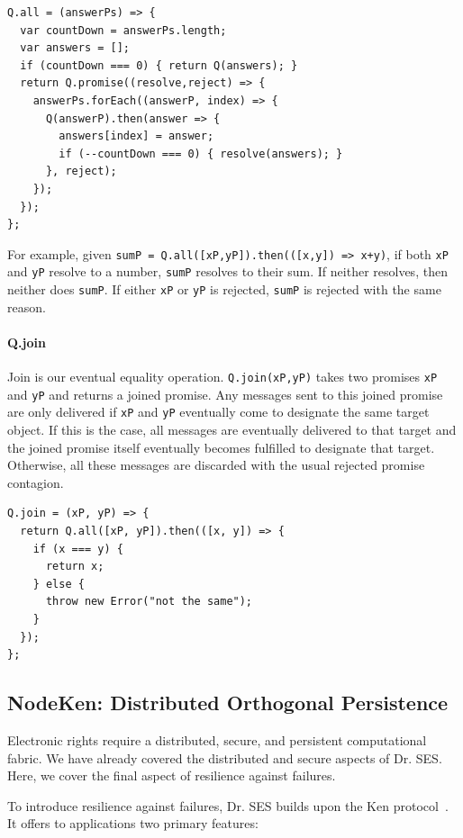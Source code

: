 \documentclass{llncs}
\begin{document}
\begin{verbatim}
Q.all = (answerPs) => {
  var countDown = answerPs.length;
  var answers = [];
  if (countDown === 0) { return Q(answers); }
  return Q.promise((resolve,reject) => {
    answerPs.forEach((answerP, index) => {
      Q(answerP).then(answer => {
        answers[index] = answer;
        if (--countDown === 0) { resolve(answers); }
      }, reject);
    });
  });
};  
\end{verbatim}

For example, given \texttt{sumP = Q.all([xP,yP]).then(([x,y]) => x+y)}, if both \texttt{xP} and \texttt{yP} resolve to a number, \texttt{sumP} resolves to their sum. If neither resolves, then neither does \texttt{sumP}. If either \texttt{xP} or \texttt{yP} is rejected, \texttt{sumP} is rejected with the same reason.

\paragraph{Q.join} Join is our eventual equality operation. \texttt{Q.join(xP,yP)} takes two promises \texttt{xP} and \texttt{yP} and returns a joined promise. Any messages sent to this joined promise are only delivered if \texttt{xP} and \texttt{yP} eventually come to designate the same target object. If this is the case, all messages are eventually delivered to that target and the joined promise itself eventually becomes fulfilled to designate that target. Otherwise, all these messages are discarded with the usual rejected promise contagion.

\begin{verbatim}
Q.join = (xP, yP) => {
  return Q.all([xP, yP]).then(([x, y]) => {
    if (x === y) {
      return x;
    } else {
      throw new Error("not the same");
    }
  });
};
\end{verbatim}

\subsection{NodeKen: Distributed Orthogonal Persistence}

Electronic rights require a distributed, secure, and persistent computational fabric.
We have already covered the distributed and secure aspects of Dr. SES. Here, we cover the final aspect of resilience against failures.

To introduce resilience against failures, Dr. SES builds upon the Ken protocol~\cite{Yoo:CKen}. It offers to applications two primary features:
\end{document}
